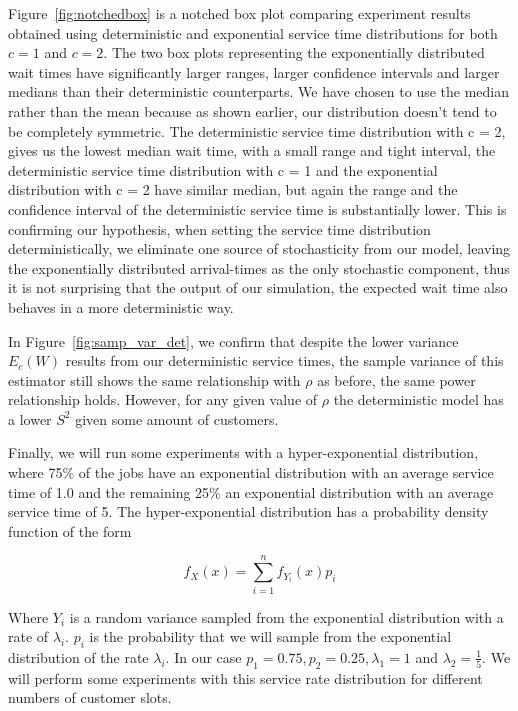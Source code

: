 \documentclass{article}
\begin{document}
    Figure~\ref{fig:notchedbox} is a notched box plot comparing experiment results obtained using deterministic and exponential service time distributions for both $c=1$ and $c=2$. The two box plots representing the exponentially distributed wait times have significantly larger ranges, larger confidence intervals and larger medians than their deterministic counterparts. We have chosen to use the median rather than the mean because as shown earlier, our distribution doesn't tend to be completely symmetric. The deterministic service time distribution with c = 2, gives us the lowest median wait time, with a small range and tight interval, the deterministic service time distribution with c = 1 and the exponential distribution with c = 2 have similar median, but again the range and the confidence interval of the deterministic service time is substantially lower. This is confirming our hypothesis, when setting the service time distribution deterministically, we eliminate one source of stochasticity from our model, leaving the exponentially distributed arrival-times as the only stochastic component, thus it is not surprising that the output of our simulation, the expected wait time also behaves in a more deterministic way.

    In Figure~\ref{fig:samp_var_det}, we confirm that despite the lower variance $E_c(W)$ results from our deterministic service times, the sample variance of this estimator still shows the same relationship with $\rho$ as before, the same power relationship holds. However, for any given value of $\rho$ the deterministic model has a lower $S^2$ given some amount of customers.

    Finally, we will run some experiments with a hyper-exponential distribution, where 75\% of the jobs have an exponential distribution with an average service time of 1.0 and the remaining 25\% an exponential distribution with an average service time of 5. The hyper-exponential distribution has a probability density function of the form

    \begin{equation}
        f_X(x) = \sum_{i=1}^n f_{Y_i} (x) p_i
    \end{equation}

    Where $Y_i$ is a random variance sampled from the exponential distribution with a rate of $\lambda _ i$. $p_i$ is the probability that we will sample from the exponential distribution of the rate $\lambda _ i$. In our case $p_1 = 0.75, p_2 = 0.25, \lambda_1 = 1$ and $\lambda_2 = \frac{1}{5}$. We will perform some experiments with this service rate distribution for different numbers of customer slots.
\end{document}

